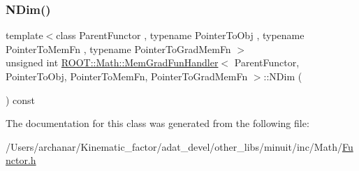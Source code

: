 \subsubsection{\texorpdfstring{NDim()}{NDim()}\hspace{0.1cm}{\footnotesize\ttfamily [2/2]}}
{\footnotesize\ttfamily template$<$class Parent\+Functor , typename Pointer\+To\+Obj , typename Pointer\+To\+Mem\+Fn , typename Pointer\+To\+Grad\+Mem\+Fn $>$ \\
unsigned int \mbox{\hyperlink{classROOT_1_1Math_1_1MemGradFunHandler}{R\+O\+O\+T\+::\+Math\+::\+Mem\+Grad\+Fun\+Handler}}$<$ Parent\+Functor, Pointer\+To\+Obj, Pointer\+To\+Mem\+Fn, Pointer\+To\+Grad\+Mem\+Fn $>$\+::N\+Dim (\begin{DoxyParamCaption}{ }\end{DoxyParamCaption}) const\hspace{0.3cm}{\ttfamily [inline]}}



The documentation for this class was generated from the following file\+:\begin{DoxyCompactItemize}
\item 
/\+Users/archanar/\+Kinematic\+\_\+factor/adat\+\_\+devel/other\+\_\+libs/minuit/inc/\+Math/\mbox{\hyperlink{other__libs_2minuit_2inc_2Math_2Functor_8h}{Functor.\+h}}\end{DoxyCompactItemize}
